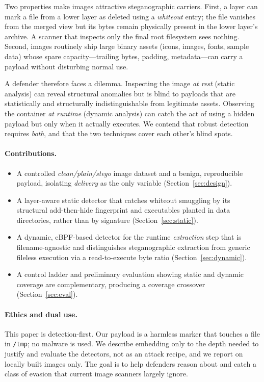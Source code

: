 \documentclass[sigconf,nonacm]{acmart}
\begin{document}
Two properties make images attractive steganographic carriers. First, a layer
can mark a file from a lower layer as deleted using a \emph{whiteout} entry; the
file vanishes from the merged view but its bytes remain physically present in the
lower layer's archive. A scanner that inspects only the final root filesystem
sees nothing. Second, images routinely ship large binary assets (icons, images,
fonts, sample data) whose spare capacity---trailing bytes, padding, metadata---can
carry a payload without disturbing normal use.

A defender therefore faces a dilemma. Inspecting the image \emph{at rest} (static
analysis) can reveal structural anomalies but is blind to payloads that are
statistically and structurally indistinguishable from legitimate assets.
Observing the container \emph{at runtime} (dynamic analysis) can catch the act of
using a hidden payload but only when it actually executes. We contend that robust
detection requires \emph{both}, and that the two techniques cover each other's
blind spots.

\paragraph{Contributions.}
\begin{itemize}
\item A controlled \emph{clean/plain/stego} image dataset and a benign,
reproducible payload, isolating \emph{delivery} as the only variable
(Section~\ref{sec:design}).
\item A layer-aware static detector that catches whiteout smuggling by its
structural add-then-hide fingerprint and executables planted in data
directories, rather than by signature (Section~\ref{sec:static}).
\item A dynamic, eBPF-based detector for the runtime \emph{extraction} step that
is filename-agnostic and distinguishes steganographic extraction from generic
fileless execution via a read-to-execute byte ratio (Section~\ref{sec:dynamic}).
\item A control ladder and preliminary evaluation showing static and dynamic
coverage are complementary, producing a coverage crossover
(Section~\ref{sec:eval}).
\end{itemize}

\paragraph{Ethics and dual use.}
This paper is detection-first. Our payload is a harmless marker that touches a
file in \texttt{/tmp}; no malware is used. We describe embedding only to the depth
needed to justify and evaluate the detectors, not as an attack recipe, and we
report on locally built images only. The goal is to help defenders reason about
and catch a class of evasion that current image scanners largely ignore.
\end{document}
